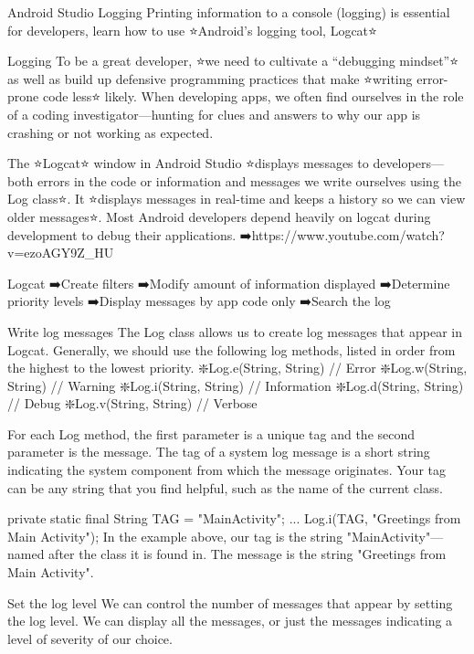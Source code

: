 Android Studio Logging
        Printing information to a console (logging) is essential for developers, learn how to use ⭐Android's logging tool, Logcat⭐

    Logging
        To be a great developer, ⭐we need to cultivate a “debugging mindset”⭐ as well as build up defensive programming practices that make ⭐writing error-prone code less⭐ likely. When developing apps, we often find ourselves in the role of a coding investigator—hunting for clues and answers to why our app is crashing or not working as expected.

        The ⭐Logcat⭐ window in Android Studio ⭐displays messages to developers—both errors in the code or information and messages we write ourselves using the Log class⭐. It ⭐displays messages in real-time and keeps a history so we can view older messages⭐. Most Android developers depend heavily on logcat during development to debug their applications.
            ➡️https://www.youtube.com/watch?v=ezoAGY9Z_HU

    Logcat
        ➡️Create filters
        ➡️Modify amount of information displayed
        ➡️Determine priority levels
        ➡️Display messages by app code only
        ➡️Search the log

    Write log messages
        The Log class allows us to create log messages that appear in Logcat. Generally, we should use the following log methods, listed in order from the highest to the lowest priority.
            ❇️Log.e(String, String) // Error
            ❇️Log.w(String, String) // Warning
            ❇️Log.i(String, String) // Information
            ❇️Log.d(String, String) // Debug
            ❇️Log.v(String, String) // Verbose
        
        For each Log method, the first parameter is a unique tag and the second parameter is the message. The tag of a system log message is a short string indicating the system component from which the message originates. Your tag can be any string that you find helpful, such as the name of the current class.

            private static final String TAG = "MainActivity";
            ...
            Log.i(TAG, "Greetings from Main Activity");
        In the example above, our tag is the string "MainActivity"—named after the class it is found in. The message is the string "Greetings from Main Activity".

    Set the log level
        We can control the number of messages that appear by setting the log level. We can display all the messages, or just the messages indicating a level of severity of our choice.

